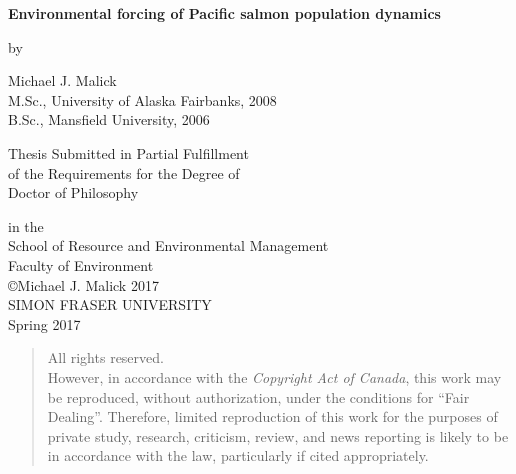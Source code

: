 


\vspace*{-11mm}
\begin{center}

\begin{spacing}{2.0}
  { \large \textbf{Environmental forcing of Pacific salmon population dynamics}}

\end{spacing}

\vspace{8mm}
by
\vspace{8mm}

\begin{doublespace}
Michael J. Malick  \\
M.Sc., University of Alaska Fairbanks, 2008 \\
B.Sc., Mansfield University, 2006 \\
\end{doublespace}

\vspace{10mm}
Thesis Submitted in Partial Fulfillment \\
of the Requirements for the Degree of \\

\vspace{5mm}
Doctor of Philosophy \\
\vspace{5mm}

in the \\
School of Resource and Environmental Management \\
Faculty of Environment \\

\vspace{10mm}
\copyright Michael J. Malick 2017 \\
SIMON FRASER UNIVERSITY \\
Spring 2017 \\

\vspace{15mm}
\begin{quote}
  \begin{center}
All rights reserved. \\
However, in accordance with the \emph{Copyright Act of Canada},
this work may be reproduced, without authorization, under the conditions for
``Fair Dealing''. Therefore, limited reproduction of this work for the purposes
of private study, research, criticism, review, and news reporting is likely to
be in accordance with the law, particularly if cited appropriately.
  \end{center}
\end{quote}


\end{center}

